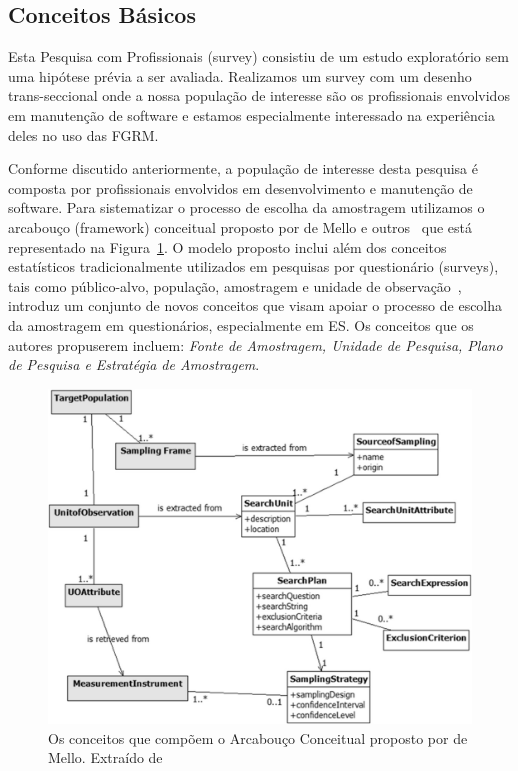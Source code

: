 \subsection{Conceitos Básicos}
Esta Pesquisa com Profissionais (survey) consistiu de um estudo exploratório sem
uma hipótese prévia a ser avaliada. Realizamos um survey com um desenho
trans-seccional\cite{kitchenham2002principles} onde a nossa população de
interesse são os profissionais envolvidos em manutenção de software e estamos
especialmente interessado na experiência deles no uso das FGRM\@.

Conforme discutido anteriormente, a população de interesse desta pesquisa é
composta por profissionais envolvidos em desenvolvimento e manutenção de
software. Para sistematizar o processo de escolha da amostragem utilizamos o
arcabouço (framework) conceitual proposto por de Mello e
outros~\cite{de2014towards} que está representado na
Figura~\ref{fig:framework-amostragem}. O modelo proposto inclui além dos
conceitos estatísticos tradicionalmente utilizados em pesquisas por questionário
(surveys), tais como público-alvo, população, amostragem e unidade de
observação~\cite{thompson2012sampling}, introduz um conjunto de novos conceitos
que visam apoiar o processo de escolha da amostragem em questionários,
especialmente em ES. Os conceitos que os autores propuserem incluem:
\textit{Fonte de Amostragem, Unidade de Pesquisa, Plano de Pesquisa e Estratégia
	de Amostragem}.

\begin{figure}[htpb]
	\centering
	\includegraphics[width=0.8\linewidth]{./chapter-pesquisa-com-profissionais/img/framework-amostragem.png}
	\caption{Os conceitos que compõem o Arcabouço Conceitual proposto por de
		Mello. Extraído de ~\cite{de2015investigating}}
	\label{fig:framework-amostragem}
\end{figure}


